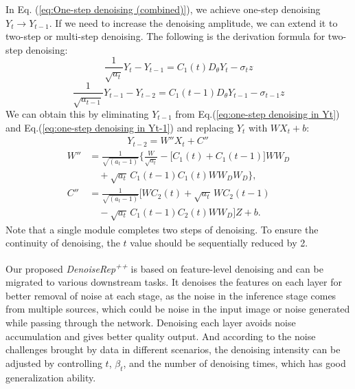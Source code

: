 \documentclass[conference]{IEEEtran}
\begin{document}
{In Eq. (\ref{eq:One-step denoising (combined)}), we achieve one-step denoising $Y_t \rightarrow Y_{t-1}$. If we need to increase the denoising amplitude, we can extend it to two-step or multi-step denoising. The following is the derivation formula for two-step denoising:
\begin{equation}
     \frac{1}  {\sqrt{a_t} }Y_t - Y_{t-1} = C_1(t)D_\theta Y_t-\sigma_tz \label{eq:one-step denoising in Yt}
\end{equation}
\begin{equation}
     \frac{1}{\sqrt{a_{t-1}} }Y_{t-1} - Y_{t-2} = C_1(t-1)D_\theta Y_{t-1}-\sigma_{t-1}z \label{eq:one-step denoising in Yt-1}
\end{equation}
We can obtain this by eliminating $Y_{t-1}$ from Eq.(\ref{eq:one-step denoising in Yt}) and Eq.(\ref{eq:one-step denoising in Yt-1}) and replacing $Y_t$ with $WX_t+b$:
\begin{equation}
\begin{aligned}
    &\quad\quad\quad\quad Y_{t-2} = W''X_t + C'' \\[6pt]
    W'' &= \frac{1}{\sqrt{(a_t-1)}}\Bigg\{ 
        \frac{W}{\sqrt{a_t}} 
        - \big[C_1(t) + C_1(t-1)\big] W W_D  \\
        &\quad + \sqrt{a_t}\, C_1(t-1) C_1(t) W W_D W_D \Bigg\}, \\[6pt]
    C'' &= \frac{1}{\sqrt{(a_t-1)}} \Big[ 
        W C_2(t) + \sqrt{a_t}\, W C_2(t-1)  \\
        &\quad - \sqrt{a_t}\, C_1(t-1) C_2(t) W W_D \Big] Z + b .
\end{aligned}
\label{eq:two_step_denoising}
\end{equation}
Note that a single module completes two steps of denoising. To ensure the continuity of denoising, the $t$ value should be sequentially reduced by 2.

Our proposed \textit{DenoiseRep\textsuperscript{++}} is based on feature-level denoising and can be migrated to various downstream tasks. It denoises the features on each layer for better removal of noise at each stage, as the noise in the inference stage comes from multiple sources, which could be noise in the input image or noise generated while passing through the network. Denoising each layer avoids noise accumulation and gives better quality output. And according to the noise challenges brought by data in different scenarios, the denoising intensity can be adjusted by controlling $t$, $\beta_t$, and the number of denoising times, which has good generalization ability.

}
\end{document}
